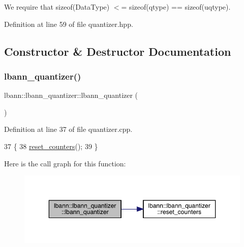 We require that sizeof(\+Data\+Type) $<$= sizeof(qtype) == sizeof(uqtype). 

Definition at line 59 of file quantizer.\+hpp.



\subsection{Constructor \& Destructor Documentation}
\mbox{\label{classlbann_1_1lbann__quantizer_a430cd47f333c678d2cb77f4ab2693914}} 
\subsubsection{\texorpdfstring{lbann\+\_\+quantizer()}{lbann\_quantizer()}}
{\footnotesize\ttfamily lbann\+::lbann\+\_\+quantizer\+::lbann\+\_\+quantizer (\begin{DoxyParamCaption}{ }\end{DoxyParamCaption})}



Definition at line 37 of file quantizer.\+cpp.


\begin{DoxyCode}
37                                  \{
38   \hyperlink{classlbann_1_1lbann__quantizer_aee1ea46e3191ad25fd310938eaf5a2e0}{reset\_counters}();
39 \}
\end{DoxyCode}
Here is the call graph for this function\+:\nopagebreak
\begin{figure}[H]
\begin{center}
\leavevmode
\includegraphics[width=350pt]{classlbann_1_1lbann__quantizer_a430cd47f333c678d2cb77f4ab2693914_cgraph}
\end{center}
\end{figure}
\mbox{\label{classlbann_1_1lbann__quantizer_ac0cc07008ff963949c2cb7b91786c61c}} 
